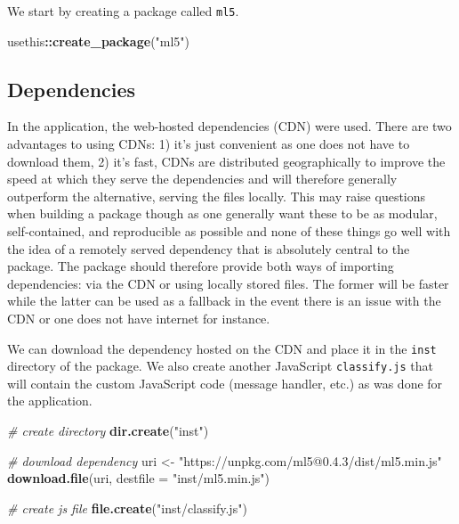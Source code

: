\documentclass[
  10pt,
]{krantz}
\makeatletter
\newenvironment{Shaded}{\begin{snugshade}}{\end{snugshade}}
\newcommand{\CommentTok}[1]{\textcolor[rgb]{0.37,0.37,0.37}{\textit{#1}}}
\newcommand{\DataTypeTok}[1]{\textcolor[rgb]{0.27,0.27,0.27}{#1}}
\newcommand{\KeywordTok}[1]{\textcolor[rgb]{0.27,0.27,0.27}{\textbf{#1}}}
\newcommand{\NormalTok}[1]{#1}
\newcommand{\OperatorTok}[1]{\textcolor[rgb]{0.43,0.43,0.43}{\textbf{#1}}}
\newcommand{\StringTok}[1]{\textcolor[rgb]{0.5,0.5,0.5}{#1}}
\newenvironment{kframe}{%
\medskip{}
\setlength{\fboxsep}{.8em}
 \def\at@end@of@kframe{}%
 \ifinner\ifhmode%
  \def\at@end@of@kframe{\end{minipage}}%
  \begin{minipage}{\columnwidth}%
 \fi\fi%
 \def\FrameCommand##1{\hskip\@totalleftmargin \hskip-\fboxsep
 \colorbox{shadecolor}{##1}\hskip-\fboxsep
     \hskip-\linewidth \hskip-\@totalleftmargin \hskip\columnwidth}%
 \MakeFramed {\advance\hsize-\width
   \@totalleftmargin\z@ \linewidth\hsize
   \@setminipage}}%
 {\par\unskip\endMakeFramed%
 \at@end@of@kframe}
\renewenvironment{Shaded}{\begin{kframe}}{\end{kframe}}
\makeatother
\begin{document}
We start by creating a package called \texttt{ml5}.

\begin{Shaded}
\begin{Highlighting}[]
\NormalTok{usethis}\OperatorTok{::}\KeywordTok{create\_package}\NormalTok{(}\StringTok{"ml5"}\NormalTok{)}
\end{Highlighting}
\end{Shaded}

\hypertarget{shiny-complete-pkg-deps}{%
\subsection{Dependencies}\label{shiny-complete-pkg-deps}}

In the application, the web-hosted dependencies (CDN) were used. There are two advantages to using CDNs: 1) it's just convenient as one does not have to download them, 2) it's fast, CDNs are distributed geographically to improve the speed at which they serve the dependencies and will therefore generally outperform the alternative, serving the files locally. This may raise questions when building a package though as one generally want these to be as modular, self-contained, and reproducible as possible and none of these things go well with the idea of a remotely served dependency that is absolutely central to the package. The package should therefore provide both ways of importing dependencies: via the CDN or using locally stored files. The former will be faster while the latter can be used as a fallback in the event there is an issue with the CDN or one does not have internet for instance.

We can download the dependency hosted on the CDN and place it in the \texttt{inst} directory of the package. We also create another JavaScript \texttt{classify.js} that will contain the custom JavaScript code (message handler, etc.) as was done for the application.

\begin{Shaded}
\begin{Highlighting}[]
\CommentTok{\# create directory}
\KeywordTok{dir.create}\NormalTok{(}\StringTok{"inst"}\NormalTok{)}

\CommentTok{\# download dependency}
\NormalTok{uri <{-}}\StringTok{ "https://unpkg.com/ml5@0.4.3/dist/ml5.min.js"}
\KeywordTok{download.file}\NormalTok{(uri, }\DataTypeTok{destfile =} \StringTok{"inst/ml5.min.js"}\NormalTok{)}

\CommentTok{\# create js file }
\KeywordTok{file.create}\NormalTok{(}\StringTok{"inst/classify.js"}\NormalTok{)}
\end{Highlighting}
\end{Shaded}
\end{document}
